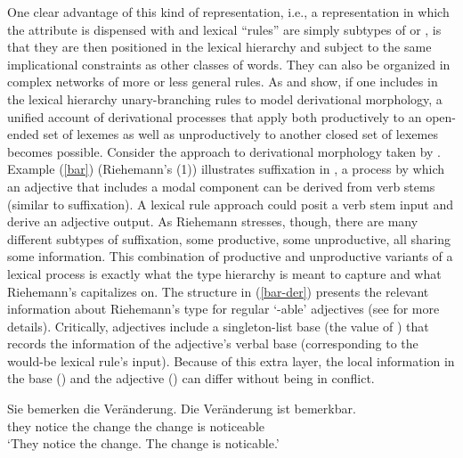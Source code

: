 \documentclass[output=paper
	        ,collection
	        ,collectionchapter
 	        ,biblatex
                ,babelshorthands
                ,newtxmath
                ,draftmode
                ,colorlinks, citecolor=brown
]{langscibook}
\begin{document}
One clear advantage of this kind of representation, i.e., a representation in which the attribute  is dispensed with and lexical ``rules'' are simply subtypes of  or , is that they are then positioned in the lexical hierarchy and subject to the same implicational constraints as other classes of words. 
They can also be organized in complex networks of more or less general rules. 
As \citet{Riehemann1998} and \citet{Koenig1999c} show, if one includes in the lexical hierarchy unary-branching rules to model derivational morphology, a unified account of derivational processes that apply both productively to an open-ended set of lexemes as well as unproductively to another closed set of lexemes becomes possible. 
Consider the approach to derivational morphology taken by \citet{Riehemann1998}. 
Example (\ref{bar}) (Riehemann's (1)) illustrates  suffixation   in , a process by which an adjective that includes a modal component can be derived from verb stems (similar to   suffixation). 
A lexical rule approach could posit a verb stem input and derive an adjective output. 
As Riehemann stresses, though, there are many different subtypes of  suffixation, some productive, some unproductive, all sharing some information. 
This combination of productive and unproductive variants of a lexical process is exactly what the type hierarchy is meant to capture and what Riehemann's  capitalizes on. 
The structure in (\ref{bar-der}) presents the relevant information about Riehemann's type for regular  `-able' adjectives (see \citealt[68]{Riehemann1998} for more details). 
Critically,  adjectives include a singleton-list base (the value of ) that records the information of the adjective's verbal base (corresponding to the would-be lexical rule's input). 
Because of this extra layer, the local information in the base () and the  adjective () can differ without being in conflict.

\ea
\label{bar}
\gll Sie bemerken die Veränderung. Die Veränderung ist bemerkbar. \\
     they notice the change the change is noticeable \\
\glt `They notice the change. The change is noticable.'
\z

\ea
\label{bar-der}
\z
\end{document}
